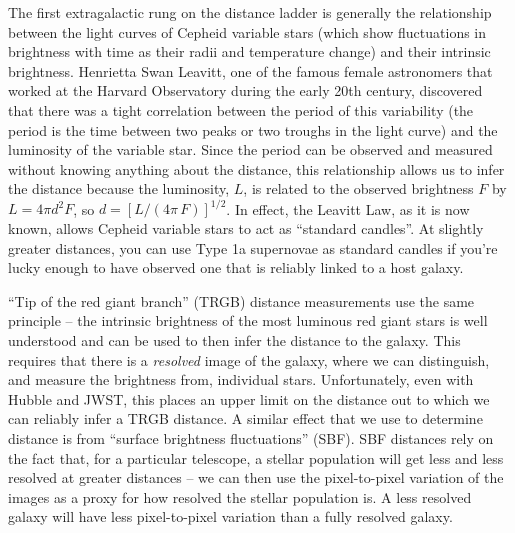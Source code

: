 The first extragalactic rung  on the distance ladder is generally the relationship between the light curves of Cepheid variable stars (which show fluctuations in brightness with time as their radii and temperature change) and their intrinsic brightness. Henrietta Swan Leavitt, one of the famous female astronomers that worked at the Harvard Observatory during the early 20th century, discovered that there was a tight correlation between the period of this variability (the period is the time between two peaks or two troughs in the light curve) and the luminosity of the variable star. Since the period can be observed and measured without knowing anything about the distance, this relationship allows us to infer the distance because the luminosity, $L$, is related to the observed brightness $F$ by $L = 4\pi d^2 F$, so $d = [L/(4\pi\, F)]^{1/2}$. In effect, the Leavitt Law, as it is now known, allows Cepheid variable stars to act as ``standard candles''. At slightly greater distances, you can use Type 1a supernovae as standard candles if you're lucky enough to have observed one that is reliably linked to a host galaxy. 

``Tip of the red giant branch'' (TRGB) distance measurements use the same principle -- the intrinsic brightness of the most luminous red giant stars is well understood and can be used to then infer the distance to the galaxy. This requires that there is a \textit{resolved} image of the galaxy, where we can distinguish, and measure the brightness from, individual stars. Unfortunately, even with Hubble and JWST, this places an upper limit on the distance out to which we can reliably infer a TRGB distance. A similar effect that we use to determine distance is from ``surface brightness fluctuations'' (SBF). SBF distances rely on the fact that, for a particular telescope, a stellar population will get less and less resolved at greater distances -- we can then use the pixel-to-pixel variation of the images as a proxy for how resolved the stellar population is. A less resolved galaxy will have less pixel-to-pixel variation than a fully resolved galaxy.

